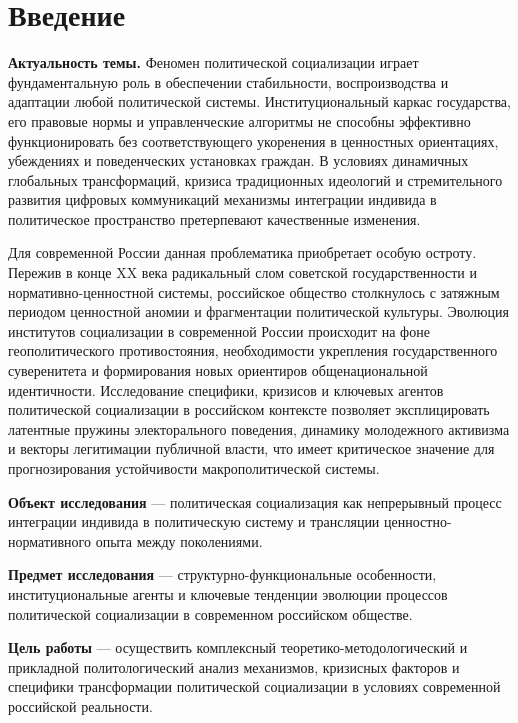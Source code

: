\section*{Введение}

\textbf{Актуальность темы.} Феномен политической социализации играет фундаментальную роль в обеспечении стабильности, воспроизводства и адаптации любой политической системы. Институциональный каркас государства, его правовые нормы и управленческие алгоритмы не способны эффективно функционировать без соответствующего укоренения в ценностных ориентациях, убеждениях и поведенческих установках граждан. В условиях динамичных глобальных трансформаций, кризиса традиционных идеологий и стремительного развития цифровых коммуникаций механизмы интеграции индивида в политическое пространство претерпевают качественные изменения. 

Для современной России данная проблематика приобретает особую остроту. Пережив в конце XX века радикальный слом советской государственности и нормативно-ценностной системы, российское общество столкнулось с затяжным периодом ценностной аномии и фрагментации политической культуры. Эволюция институтов социализации в современной России происходит на фоне геополитического противостояния, необходимости укрепления государственного суверенитета и формирования новых ориентиров общенациональной идентичности. Исследование специфики, кризисов и ключевых агентов политической социализации в российском контексте позволяет эксплицировать латентные пружины электорального поведения, динамику молодежного активизма и векторы легитимации публичной власти, что имеет критическое значение для прогнозирования устойчивости макрополитической системы.

\textbf{Объект исследования} --- политическая социализация как непрерывный процесс интеграции индивида в политическую систему и трансляции ценностно-нормативного опыта между поколениями.

\textbf{Предмет исследования} --- структурно-функциональные особенности, институциональные агенты и ключевые тенденции эволюции процессов политической социализации в современном российском обществе.

\textbf{Цель работы} --- осуществить комплексный теоретико-методологический и прикладной политологический анализ механизмов, кризисных факторов и специфики трансформации политической социализации в условиях современной российской реальности.

